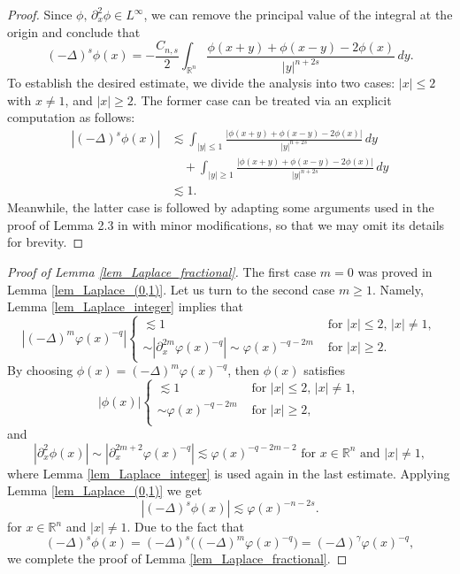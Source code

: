 \documentclass[11pt,reqno]{amsart}
\numberwithin{equation}{section}
\begin{document}
\begin{proof}
Since $\phi,\,\partial_x^2\phi \in L^\infty$, we can remove the principal value of the integral at the origin and conclude that
$$(-\Delta)^s\phi(x)=-\frac{C_{n,s}}{2} \int_{\mathbb{R}^n}\frac{\phi(x+y)+\phi(x-y)-2\phi(x)}{|y|^{n+ 2s}}\,dy.$$
To establish the desired estimate, we divide the analysis into two cases: $|x|\leq 2$ with $x\neq 1$, and $|x|\geq 2$. The former case can be treated via an explicit computation as follows: 
\begin{align}
|(-\Delta)^s\phi(x)| &\lesssim \int_{|y|\leq1}\frac{|\phi(x+y) + \phi(x-y) - 2\phi(x)|}{|y|^{n+2s}}\,dy \nonumber\\
&\quad + \int_{|y|\geq1}\frac{|\phi(x+y) + \phi(x-y) - 2\phi(x)|}{|y|^{n+2s}}\,dy \nonumber\\
&\lesssim 1. \label{case1eq1}
\end{align}
Meanwhile, the latter case is followed by adapting some arguments used in the proof of Lemma 2.3 in \cite{Anhblowup} with minor modifications, so that we may omit its details for brevity.
\end{proof}

\begin{proof}[Proof of Lemma \ref{lem_Laplace_fractional}]
\noindent The first case $m=0$ was proved in Lemma \ref{lem_Laplace_(0,1)}. Let us turn to the second case $m\geq 1$. Namely, Lemma \ref{lem_Laplace_integer} implies that
\[ |(-\Delta)^{m}\varphi(x)^{-q}|
\begin{cases}
    \lesssim 1 &\text{ for }|x|\leq 2,\,|x|\neq 1,\\
    \sim |\partial^{2m}_x\varphi(x)^{-q}|\sim\varphi(x)^{-q-2m} &\text{ for }|x|\geq 2.
\end{cases}
\]
By choosing $\phi(x)=(-\Delta)^{m}\varphi(x)^{-q}$, then $\phi(x)$ satisfies 
\[|\phi(x)|
\begin{cases}
    \lesssim 1&\text{ for }|x|\leq 2,\,|x|\neq 1,\\
    \sim \varphi(x)^{-q-2m}&\text{ for }|x|\geq 2,\\
\end{cases}
\]
and
$$ |\partial^2_x\phi(x)|\sim \left|\partial^{2m+2}_x\varphi(x)^{-q}\right|\lesssim \varphi(x)^{-q-2m-2} \text{ for } x\in \mathbb{R}^n \text{ and }|x|\neq 1, $$
where Lemma \ref{lem_Laplace_integer} is used again in the last estimate. Applying Lemma \ref{lem_Laplace_(0,1)} we get
\[
|(-\Delta)^s\phi(x)|\lesssim \varphi(x)^{-n-2s}.
\]
for $x\in \mathbb{R}^n$ and $|x|\neq 1$. Due to the fact that
$$ (-\Delta)^{s}\phi(x)=(-\Delta)^{s}\big((-\Delta)^{m}\varphi(x)^{-q}\big)=(-\Delta)^{\gamma}\varphi(x)^{-q}, $$
we complete the proof of Lemma \ref{lem_Laplace_fractional}.
\end{proof}
\end{document}
